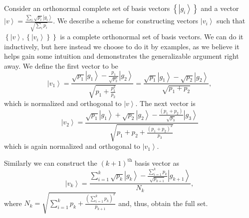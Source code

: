 \documentclass{article}
\begin{document}
Consider an orthonormal complete set of basis vectors $\left\{ \left|g_{i}\right\rangle \right\} $
and a vector $\left|v\right\rangle =\frac{\sum_{i}\sqrt{p_{i}}\left|g_{i}\right\rangle }{\sqrt{\sum_{i}p_{i}}}$.
We describe a scheme for constructing vectors $\left|v_{i}\right\rangle $
such that $\left\{ \left|v\right\rangle ,\left\{ \left|v_{i}\right\rangle \right\} \right\} $
is a complete orthonormal set of basis vectors. We can do
it inductively, but here instead we choose to do it by examples, as we believe it helps gain some
intuition and demonstrates the generalizable argument right away.
We define the first vector to be 
\begin{displaymath}
\left|v_{1}\right\rangle =\frac{\sqrt{p_{1}}\left|g_{1}\right\rangle -\frac{p_{1}}{\sqrt{p_{2}}}\left|g_{2}\right\rangle }{\sqrt{p_{1}+\frac{p_{1}^{2}}{p_{2}}}}=\frac{\sqrt{p_{1}}\left|g_{1}\right\rangle -\sqrt{p_{2}}\left|g_{2}\right\rangle }{\sqrt{p_{1}+p_{2}}},
\end{displaymath}
which is normalized and orthogonal to $\left|v\right\rangle $. The next
vector is 
\begin{displaymath}
\left|v_{2}\right\rangle =\frac{\sqrt{p_{1}}\left|g_{1}\right\rangle +\sqrt{p_{2}}\left|g_{2}\right\rangle -\frac{\left(p_{1}+p_{2}\right)}{\sqrt{p_{3}}}\left|g_{3}\right\rangle }{\sqrt{p_{1}+p_{2}+\frac{(p_{1}+p_{2})^{2}}{p_{3}}}}
\end{displaymath}
which is again normalized and orthogonal to $\left|v_{1}\right\rangle $.

Similarly we can construct the $\left(k+1\right)^{\text{th}}$ basis
vector as 
\begin{displaymath}
\left|v_{k}\right\rangle =\frac{\sum_{i=1}^{k}\sqrt{p_{k}}\left|g_{k}\right\rangle -\frac{\sum_{i=1}^{k}p_{k}}{\sqrt{p_{k+1}}}\left|g_{k+1}\right\rangle }{N_{k}},
\end{displaymath}
where $N_{k}=\sqrt{\sum_{i=1}^{k}p_{k}+\frac{(\sum_{i=1}^{k}p_{k})^{2}}{p_{k+1}}}$
and, thus, obtain the full set.
\end{document}
